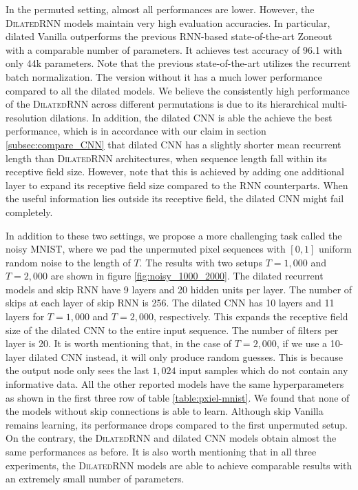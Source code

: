 \documentclass{article}
\newcommand{\algname}{\textsc{DilatedRNN }}
\begin{document}
In the permuted setting, almost all performances are lower.  However, the \algname models maintain very high evaluation accuracies.  In particular, dilated Vanilla outperforms the previous RNN-based state-of-the-art Zoneout \cite{krueger2016zoneout} with a comparable number of parameters.  It achieves test accuracy of 96.1 with only 44k parameters.  Note that the previous state-of-the-art utilizes the recurrent batch normalization.  The version without it has a much lower performance compared to all the dilated models. We believe the consistently high performance of the \algname across different permutations is due to its hierarchical multi-resolution dilations.   In addition, the dilated CNN is able the achieve the best performance, which is in accordance with our claim in section \ref{subsec:compare_CNN} that dilated CNN has a slightly shorter mean recurrent length than \algname architectures, when sequence length fall within its receptive field size.  However, note that this is achieved by adding one additional layer to expand its receptive field size compared to the RNN counterparts. When the useful information lies outside its receptive field, the dilated CNN might fail completely.

In addition to these two settings, we propose a more challenging task called the noisy MNIST, where we pad the unpermuted pixel sequences with $[0, 1]$ uniform random noise to the length of $T$.  The results with two setups $T=1,000$ and $T=2,000$ are shown in figure \ref{fig:noisy_1000_2000}.  The dilated recurrent models and skip RNN have 9 layers and 20 hidden units per layer.  The number of skips at each layer of skip RNN is 256.  The dilated CNN has 10 layers and 11 layers for $T=1,000$ and $T=2,000$, respectively.  This expands the receptive field size of the dilated CNN to the entire input sequence.  The number of filters per layer is 20. It is worth mentioning that, in the case of $T=2,000$, if we use a 10-layer dilated CNN instead, it will only produce random guesses.  This is because the output node only sees the last $1,024$ input samples which do not contain any informative data.  All the other reported models have the same hyperparameters as shown in the first three row of table \ref{table:pxiel-mnist}.  We found that none of the models without skip connections is able to learn.  Although skip Vanilla remains learning, its performance drops compared to the first unpermuted setup.  On the contrary, the \algname and dilated CNN models obtain almost the same performances as before.  It is also worth mentioning that in all three experiments, the \algname models are able to achieve comparable results with an extremely small number of parameters.
\end{document}
